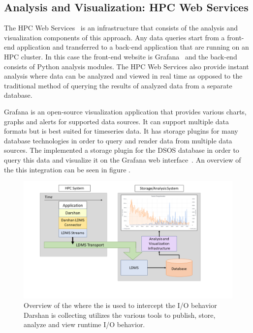 \documentclass[conference]{IEEEtran}
\begin{document}
\subsection{Analysis and Visualization: HPC Web Services}
The HPC Web Services~\cite{ClusterAV} is an infrastructure that consists of the analysis and visualization components of this approach. Any data queries start from a front-end application and transferred to a back-end application that are running on an HPC cluster. In this case the front-end website is Grafana~\cite{grafana-website} and the back-end consists of Python analysis modules. The HPC Web Services also provide instant analysis where data can be analyzed and viewed in real time as opposed to the traditional method of querying the results of analyzed data from a separate database.

Grafana is an open-source visualization application that provides various charts, graphs and alerts for supported data sources. It can support multiple data formats but is best suited for timeseries data. It has storage plugins for many database technologies in order to query and render data from multiple data sources. The \Darshan implemented a storage plugin for the DSOS database in order to query this data and visualize it on the Grafana web interface~\cite{grafana-website}. An overview of the this integration can be seen in figure .

\begin{figure}
  \centering
    \includegraphics[trim=3cm 2cm 0cm 0cm, clip,width=1.2\linewidth]{figs/darshan-integration.png}
\caption{Overview of the \Darshan where the \connector is used to intercept the I/O behavior Darshan is collecting utilizes the various tools to publish, store, analyze and view runtime I/O behavior.}
\label{f:CSV Header and Output}
\end{figure}
\end{document}
